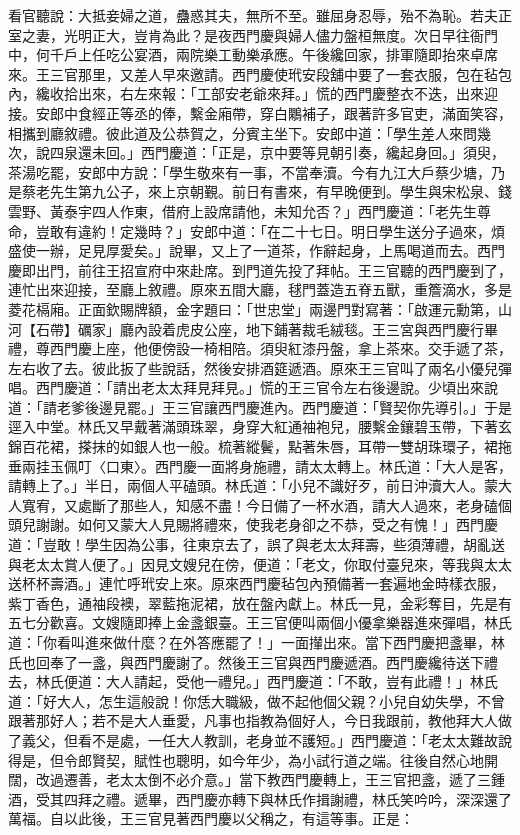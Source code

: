 看官聽說：大抵妾婦之道，蠱惑其夫，無所不至。雖屈身忍辱，殆不為恥。若夫正室之妻，光明正大，豈肯為此？是夜西門慶與婦人儘力盤桓無度。次日早往衙門中，何千戶上任吃公宴酒，兩院樂工動樂承應。午後纔回家，排軍隨即抬來卓席來。王三官那里，又差人早來邀請。西門慶使玳安段舖中要了一套衣服，包在毡包內，纔收拾出來，右左來報：「工部安老爺來拜。」慌的西門慶整衣不迭，出來迎接。安郎中食經正等丞的俸，繫金廂帶，穿白鷴補子，跟著許多官吏，滿面笑容，相攜到廳敘禮。彼此道及公恭賀之，分賓主坐下。安郎中道：「學生差人來問幾次，說四泉還未回。」西門慶道：「正是，京中要等見朝引奏，纔起身回。」須臾，茶湯吃罷，安郎中方說：「學生敬來有一事，不當奉瀆。今有九江大戶蔡少塘，乃是蔡老先生第九公子，來上京朝覲。前日有書來，有早晚便到。學生與宋松泉、錢雲野、黃泰宇四人作東，借府上設席請他，未知允否？」西門慶道：「老先生尊命，豈敢有違約！定幾時？」安郎中道：「在二十七日。明日學生送分子過來，煩盛使一辦，足見厚愛矣。」說畢，又上了一道茶，作辭起身，上馬喝道而去。西門慶即出門，前往王招宣府中來赴席。到門道先投了拜帖。王三官聽的西門慶到了，連忙出來迎接，至廳上敘禮。原來五間大廳，毬門蓋造五脊五獸，重簷滴水，多是菱花槅廂。正面欽賜牌額，金字題曰：「世忠堂」兩邊門對寫著：「啟運元勳第，山河【石帶】礪家」廳內設着虎皮公座，地下鋪著裁毛絨毯。王三宮與西門慶行畢禮，尊西門慶上座，他便傍設一椅相陪。須臾紅漆丹盤，拿上茶來。交手遞了茶，左右收了去。彼此扳了些說話，然後安排酒筵遞酒。原來王三官叫了兩名小優兒彈唱。西門慶道：「請出老太太拜見拜見。」慌的王三官令左右後邊說。少頃出來說道：「請老爹後邊見罷。」王三官讓西門慶進內。西門慶道：「賢契你先導引。」于是逕入中堂。林氏又早戴著滿頭珠翠，身穿大紅通袖袍兒，腰繫金鑲碧玉帶，下著玄錦百花裙，搽抹的如銀人也一般。梳著縱鬢，點著朱唇，耳帶一雙胡珠環子，裙拖垂兩挂玉佩叮〈口東〉。西門慶一面將身施禮，請太太轉上。林氏道：「大人是客，請轉上了。」半日，兩個人平磕頭。林氏道：「小兒不識好歹，前日沖瀆大人。蒙大人寬宥，又處斷了那些人，知感不盡！今日備了一杯水酒，請大人過來，老身磕個頭兒謝謝。如何又蒙大人見賜將禮來，使我老身卻之不恭，受之有愧！」西門慶道：「豈敢！學生因為公事，往東京去了，誤了與老太太拜壽，些須薄禮，胡亂送與老太太賞人便了。」因見文嫂兒在傍，便道：「老文，你取付臺兒來，等我與太太送杯杯壽酒。」連忙呼玳安上來。原來西門慶毡包內預備著一套遍地金時樣衣服，紫丁香色，通袖段襖，翠藍拖泥裙，放在盤內獻上。林氏一見，金彩奪目，先是有五七分歡喜。文嫂隨即捧上金盞銀臺。王三官便叫兩個小優拿樂器進來彈唱，林氏道：「你看叫進來做什麼？在外答應罷了！」一面攆出來。當下西門慶把盞畢，林氏也回奉了一盞，與西門慶謝了。然後王三官與西門慶遞酒。西門慶纔待送下禮去，林氏便道：大人請起，受他一禮兒。」西門慶道：「不敢，豈有此禮！」林氏道：「好大人，怎生這般說！你恁大職級，做不起他個父親？小兒自幼失學，不曾跟著那好人；若不是大人垂愛，凡事也指教為個好人，今日我跟前，教他拜大人做了義父，但看不是處，一任大人教訓，老身並不護短。」西門慶道：「老太太難故說得是，但令郎賢契，賦性也聰明，如今年少，為小試行道之端。往後自然心地開闊，改過遷善，老太太倒不必介意。」當下教西門慶轉上，王三官把盞，遞了三鍾酒，受其四拜之禮。遞畢，西門慶亦轉下與林氏作揖謝禮，林氏笑吟吟，深深還了萬福。自以此後，王三官見著西門慶以父稱之，有這等事。正是：

